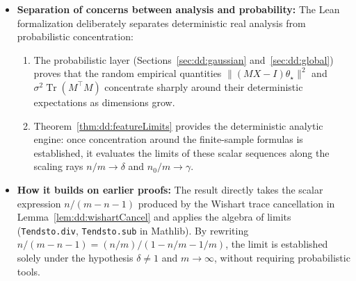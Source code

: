 \begin{remark}
\begin{itemize}
  \item \textbf{Separation of concerns between analysis and probability:}
  The Lean formalization deliberately separates deterministic real analysis from probabilistic concentration:
  \begin{enumerate}
    \item The probabilistic layer (Sections~\ref{sec:dd:gaussian} and~\ref{sec:dd:global}) proves that the random empirical quantities $\|(MX-I)\theta_\star\|^2$ and $\sigma^2\operatorname{Tr}(M^\top M)$ concentrate sharply around their deterministic expectations as dimensions grow.
    \item Theorem~\ref{thm:dd:featureLimits} provides the deterministic analytic engine: once concentration around the finite-sample formulas is established, it evaluates the limits of these scalar sequences along the scaling rays $n/m\to\delta$ and $n_0/m\to\gamma$.
  \end{enumerate}

  \item \textbf{How it builds on earlier proofs:}
  The result directly takes the scalar expression $n/(m-n-1)$ produced by the Wishart trace cancellation in Lemma~\ref{lem:dd:wishartCancel} and applies the algebra of limits (\texttt{Tendsto.div}, \texttt{Tendsto.sub} in Mathlib). By rewriting $n/(m-n-1) = (n/m)\big/(1 - n/m - 1/m)$, the limit is established solely under the hypothesis $\delta\ne1$ and $m\to\infty$, without requiring probabilistic tools.


\end{itemize}
\end{remark}
